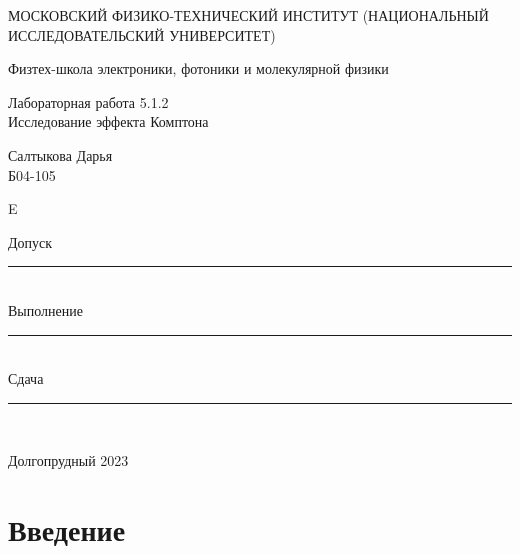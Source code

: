 \documentclass[a4paper,12pt]{article} %
\begin{document}
\newenvironment{lines}[1][\textwidth] %
{
\newcolumntype{E}{>{}p{#1}<{\hrulefill}} %
\begin{flushright} %
\begin{tabular}[h]{E} %
}
{\end{tabular}\end{flushright}
}
	
	\begin{titlepage}
	\begin{center}
		{\large МОСКОВСКИЙ ФИЗИКО-ТЕХНИЧЕСКИЙ ИНСТИТУТ (НАЦИОНАЛЬНЫЙ ИССЛЕДОВАТЕЛЬСКИЙ УНИВЕРСИТЕТ)}
	\end{center}
	\begin{center}
		{\large Физтех-школа электроники, фотоники и молекулярной физики}
	\end{center}
	
	
	\vspace{4.5cm}
	{\huge
		\begin{center}
			{Лабораторная работа 5.1.2}\\
			Исследование эффекта Комптона
		\end{center}
	}
	\vspace{2cm}
	\begin{flushright}
		{\LARGE Салтыкова Дарья \\
			\vspace{0.5cm}
			Б04-105}
	\end{flushright}
	
	\vspace{0.5cm}
	
	\begin{lines}[.5
	\textwidth]
  {\LARGE Допуск} \rule{6.5cm}{0.25pt} \vspace{0.5cm}\\
 {\LARGE Выполнение} \rule{3cm}{0.25pt}\vspace{0.5cm} \\ {\LARGE Сдача} \rule{3cm}{0.25pt} \\ %
\end{lines}
	\vspace{8cm}
	\begin{center}
		Долгопрудный 2023
	\end{center}
\end{titlepage}

\section{Введение}
\end{document}
